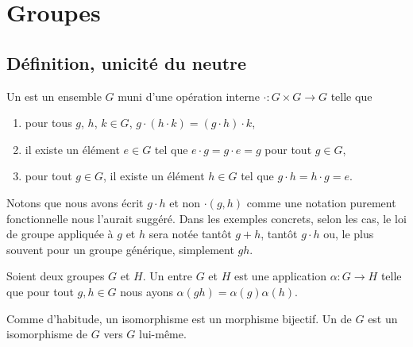 \section{Groupes}

\subsection{Définition, unicité du neutre}

\begin{definition}[Groupe]      \label{DEFooBMUZooLAfbeM}
    Un  est un ensemble \( G\) muni d'une opération interne \( \cdot\colon G\times G\to G\) telle que
    \begin{enumerate}
        \item
            pour tous \( g\), \( h\), \( k\in G\), \( g\cdot(h\cdot k)=(g\cdot h)\cdot k\),
        \item
            il existe un élément \( e\in G\) tel que \( e\cdot g=g\cdot e=g\) pour tout \( g\in G\),
        \item
            pour tout \( g\in G\), il existe un élément \( h\in  G\) tel que \(g\cdot h=h\cdot g=e \).
    \end{enumerate}
\end{definition}

Notons que nous avons écrit \( g\cdot h\) et non \( \cdot(g,h)\) comme une notation purement fonctionnelle nous l'aurait suggéré. Dans les exemples concrets, selon les cas, le loi de groupe appliquée à \( g\) et \( h\) sera notée tantôt \( g+h\), tantôt \( g\cdot h\) ou, le plus souvent pour un groupe générique, simplement \( gh\).

\begin{definition}        \label{DEFooBEHTooMeCOTX}
    Soient deux groupes \( G\) et \( H\). Un  entre \( G\) et \( H\) est une application \( \alpha\colon G\to H\) telle que pour tout \( g,h\in G\) nous ayons \( \alpha(gh)=\alpha(g)\alpha(h)\).

    Comme d'habitude, un isomorphisme est un morphisme bijectif. Un  de \( G\) est un isomorphisme de \( G\) vers \( G\) lui-même.
\end{definition}

